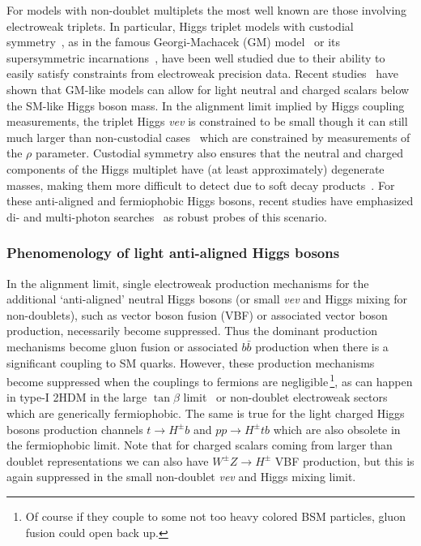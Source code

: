 \documentclass[../report.tex]{subfiles}
\begin{document}
For models with non-doublet multiplets the most well known are those involving electroweak triplets. In particular, Higgs triplet models with custodial symmetry~\cite{Sikivie:1980hm}, as in the famous Georgi-Machacek (GM) model~\cite{Georgi:1985nv,Chanowitz:1985ug,Gunion:1989ci,Gunion:1990dt,Hartling:2014zca} or its supersymmetric incarnations~\cite{Cort:2013foa,Garcia-Pepin:2014yfa,Vega:2017gkk}, have been well studied due to their ability to easily satisfy constraints from electroweak precision data. Recent studies~\cite{Davoudiasl:2004aj,Vega:2017gkk,Vega:2018ddp} have shown that GM-like models can allow for light neutral and charged scalars below the SM-like Higgs boson mass. In the alignment limit implied by Higgs coupling measurements, the triplet Higgs \emph{vev} is constrained to be small though it can still much larger than non-custodial cases~\cite{Tanabashi:2018oca,Haber:1999zh} which are constrained by measurements of the $\rho$ parameter. Custodial symmetry also ensures that the neutral and charged components of the Higgs multiplet have (at least approximately) degenerate masses, making them more difficult to detect due to soft decay products~\cite{Buckley:2009kv,Ismail:2016zby}. For these anti-aligned and fermiophobic Higgs bosons, recent studies have emphasized di- and multi-photon searches~\cite{Aaltonen:2016fnw,Delgado:2016arn,Brooijmans:2016vro,Vega:2018ddp} as robust probes of this scenario.

\subsubsection{Phenomenology of light anti-aligned Higgs bosons}\label{sec:pheno}

In the alignment limit, single electroweak production mechanisms for the
additional `anti-aligned' neutral Higgs bosons (or small \emph{vev} and Higgs mixing for non-doublets), such as vector boson fusion (VBF) or associated vector boson production, necessarily become suppressed. Thus the dominant production mechanisms become gluon fusion or associated $b\bar{b}$ production when there is a significant coupling to SM quarks. However, these production mechanisms become suppressed when the couplings to fermions are negligible\,\footnote{Of course if they couple to some not too heavy colored BSM particles, gluon fusion could open back up.}, as can happen in type-I 2HDM in the large $\tan\beta$ limit~\cite{Akeroyd:2003bt} or non-doublet electroweak sectors which are generically fermiophobic. The same is true for the light charged Higgs bosons production channels $t \to H^\pm b$ and $pp \to H^\pm t b$ which are also obsolete in the fermiophobic limit. Note that for charged scalars coming from larger than doublet representations we can also have $W^\pm Z \to H^\pm$ VBF production, but this is again suppressed in the small non-doublet \emph{vev} and Higgs mixing limit. 
\end{document}
